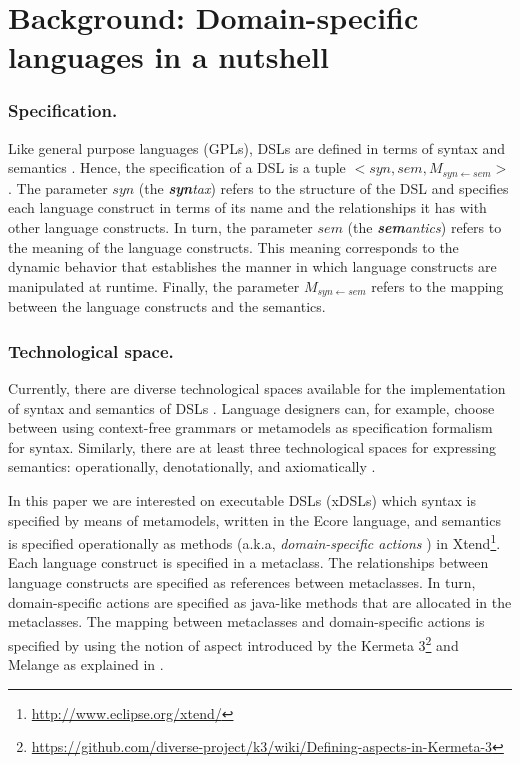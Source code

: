 \section{Background: Domain-specific languages in a nutshell}
\label{sec:background}

\subsubsection{Specification.} Like general purpose languages (GPLs), DSLs are defined in terms of syntax and semantics \cite{Harel:2004b}. Hence, the specification of a DSL is a tuple $<syn,sem,M_{syn\leftarrow sem}>$ \cite{Combemale:2013}. The parameter $syn$ (the \textit{\textbf{syn}tax}) refers to the structure of the DSL and specifies each language construct in terms of its name and the relationships it has with other language constructs. In turn, the parameter $sem$ (the \textit{\textbf{sem}antics}) refers to the meaning of the language constructs. This meaning corresponds to the dynamic behavior that establishes the manner in which language constructs are manipulated at runtime. Finally, the parameter $M_{syn\leftarrow sem}$ refers to the mapping between the language constructs and the semantics. 
 

\vspace{-3mm}
\subsubsection{Technological space.} Currently, there are diverse technological spaces available for the implementation of syntax and semantics of DSLs \cite{Mernik:2005b}. Language designers can, for example, choose between using context-free grammars or metamodels as specification formalism for syntax. Similarly, there are at least three technological spaces for expressing semantics: operationally, denotationally, and axiomatically \cite{Mosses:2001}.

In this paper we are interested on executable DSLs (xDSLs) which syntax is specified by means of metamodels, written in the Ecore language, and semantics is specified operationally as methods (a.k.a, \textit{domain-specific actions} \cite{Combemale:2013}) in Xtend\footnote{\url{http://www.eclipse.org/xtend/}}. Each language construct is specified in a metaclass. The relationships between language constructs are specified as references between metaclasses. In turn, domain-specific actions are specified as java-like methods that are allocated in the metaclasses. The mapping between metaclasses and domain-specific actions is specified by using the notion of aspect introduced by the Kermeta 3\footnote{\url{https://github.com/diverse-project/k3/wiki/Defining-aspects-in-Kermeta-3}} and Melange as explained in \cite{degueule:2015}. 
 
